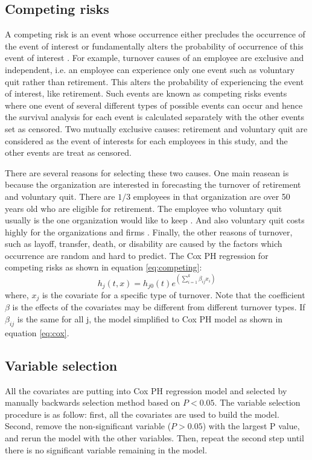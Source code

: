 \documentclass[12pt,letterpaper]{article}
\begin{document}
\subsection{Competing risks}
  A competing risk is an event whose occurrence either precludes the occurrence of the event of interest or fundamentally alters the probability of occurrence of this event of interest \citep{tableman2003}. For example, turnover causes of an employee are exclusive and independent, i.e. an employee can experience only one event such as voluntary quit rather than retirement. This alters the probability of experiencing the event of interest, like retirement. Such events are known as competing risks events where one event of several different types of possible events can occur and hence the survival analysis for each event is calculated separately with the other events set as censored. Two mutually exclusive causes: retirement and voluntary quit are considered as the event of interests for each employees in this study, and the other events are treat as censored.

  There are several reasons for selecting these two causes. One main reasean is because the organization are interested in forecasting the turnover of retirement and voluntary quit. There are $1/3$  employees in that organization are over 50 years old who are eligible for retirement. The employee who voluntary quit usually is the one organization would like to keep \citep{allen2010}. And also voluntary quit costs highly for the organizations and firms \citep{selden2000}. Finally, the other reasons of turnover, such as layoff, transfer, death, or disability are caused by the factors which occurrence are random and hard to predict. The Cox PH regression for competing risks as shown in equation \ref{eq:competing}:
  \begin{equation}
  \label{eq:competing}
  h_j(t,x)=h_{j0}(t)e^{(\sum_{i=1}^{k}\beta_{ij}x_i)}
  \end{equation}
  where, $x_{j}$ is the covariate for a specific type of turnover. Note that the coefficient $\beta$ is the effects of the covariates may be different from different turnover types. If $\beta_{ij}$  is the same for all j, the model simplified to Cox PH model as shown in equation \ref{eq:cox}.


\subsection{Variable selection}
All the covariates are putting into Cox PH regression model and selected by manually backwards selection method based on $P<0.05$.  The variable selection procedure is as follow: first, all the covariates are used to build the model. Second, remove the non-significant variable ($P>0.05$) with the largest P value, and rerun the model with the other variables. Then, repeat the second step until there is no significant variable remaining in the model.
\end{document}

